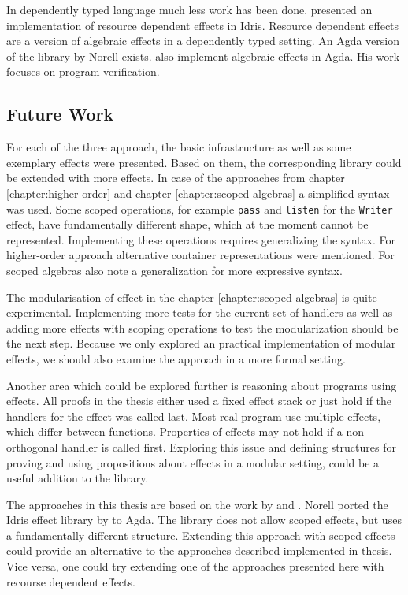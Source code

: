 \documentclass[10pt,a4paper,twoside,notitlepage]{report}
\begin{document}
In dependently typed language much less work has been done.
\textcite{DBLP:conf/icfp/Brady13} presented an implementation of resource
dependent effects in Idris.
Resource dependent effects are a version of algebraic effects in a dependently
typed setting.
An Agda version of the library by Norell exists.
\textcite{baanen2019algebraic} also implement algebraic effects in Agda.
His work focuses on program verification.


\subsection{Future Work}

For each of the three approach, the basic infrastructure as well as some
exemplary effects were presented.
Based on them, the corresponding library could be extended with more effects.
In case of the approaches from chapter \ref{chapter:higher-order} and chapter
\ref{chapter:scoped-algebras} a simplified syntax was used.
Some scoped operations, for example \texttt{pass} and \texttt{listen} for the
\texttt{Writer} effect, have fundamentally different shape, which at the moment
cannot be represented.
Implementing these operations requires generalizing the syntax.
For higher-order approach alternative container representations were mentioned.
For scoped algebras \textcite{DBLP:conf/lics/PirogSWJ18} also note a
generalization for more expressive syntax.

The modularisation of effect in the chapter \ref{chapter:scoped-algebras} is
quite experimental.
Implementing more tests for the current set of handlers as well as adding more
effects with scoping operations to test the modularization should be the next
step.
Because we only explored an practical implementation of modular effects, we
should also examine the approach in a more formal setting.

Another area which could be explored further is reasoning about programs using
effects.
All proofs in the thesis either used a fixed effect stack or just hold if the
handlers for the effect was called last.
Most real program use multiple effects, which differ between functions.
Properties of effects may not hold if a non-orthogonal handler is called first.
Exploring this issue and defining structures for proving and using propositions
about effects in a modular setting, could be a useful addition to the library.

The approaches in this thesis are based on the work by
\textcite{DBLP:conf/haskell/WuSH14} and \textcite{DBLP:conf/lics/PirogSWJ18}.
Norell ported the Idris effect library by \textcite{DBLP:conf/icfp/Brady13} to
Agda.
The library does not allow scoped effects, but uses a fundamentally different
structure.
Extending this approach with scoped effects could provide an alternative to the
approaches described implemented in thesis.
Vice versa, one could try extending one of the approaches presented here with
recourse dependent effects.


\printbibliography
\end{document}
